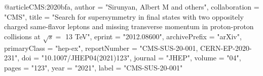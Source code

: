 @article{CMS:2020bfa,
    author = "Sirunyan, Albert M and others",
    collaboration = "CMS",
    title = "{Search for supersymmetry in final states with two oppositely charged same-flavor leptons and missing transverse momentum in proton-proton collisions at $\sqrt{s} =$ 13 TeV}",
    eprint = "2012.08600",
    archivePrefix = "arXiv",
    primaryClass = "hep-ex",
    reportNumber = "CMS-SUS-20-001, CERN-EP-2020-231",
    doi = "10.1007/JHEP04(2021)123",
    journal = "JHEP",
    volume = "04",
    pages = "123",
    year = "2021",
    label = "CMS-SUS-20-001"
}

